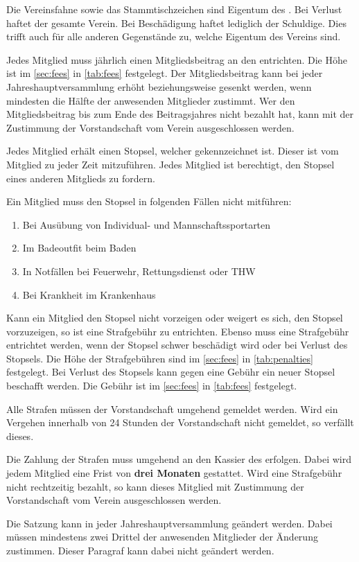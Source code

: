 Die Vereinsfahne sowie das Stammtischzeichen sind Eigentum des \emph{\vereinsName}.
Bei Verlust haftet der gesamte Verein.
Bei Beschädigung haftet lediglich der Schuldige.
Dies trifft auch für alle anderen Gegenstände zu, welche Eigentum des Vereins sind.

Jedes Mitglied muss jährlich einen Mitgliedsbeitrag an den \emph{\vereinsName} entrichten.
Die Höhe ist im \autoref{sec:fees} in \autoref{tab:fees} festgelegt.
Der Mitgliedsbeitrag kann bei jeder Jahreshauptversammlung erhöht beziehungsweise gesenkt werden,
wenn mindesten die Hälfte der anwesenden Mitglieder zustimmt.
Wer den Mitgliedsbeitrag bis zum Ende des Beitragsjahres nicht bezahlt hat,
kann mit der Zustimmung der Vorstandschaft vom Verein ausgeschlossen werden.

Jedes Mitglied erhält einen Stopsel, welcher gekennzeichnet ist.
Dieser ist vom Mitglied zu jeder Zeit mitzuführen.
Jedes Mitglied ist berechtigt, den Stopsel eines anderen Mitglieds zu fordern.

Ein Mitglied muss den Stopsel in folgenden Fällen nicht mitführen:
\begin{enumerate}
    \item Bei Ausübung von Individual- und Mannschaftssportarten
    \item Im Badeoutfit beim Baden
    \item In Notfällen bei Feuerwehr, Rettungsdienst oder THW
    \item Bei Krankheit im Krankenhaus
\end{enumerate}

Kann ein Mitglied den Stopsel nicht vorzeigen oder weigert es sich,
den Stopsel vorzuzeigen, so ist eine Strafgebühr zu entrichten.
Ebenso muss eine Strafgebühr entrichtet werden, wenn der Stopsel schwer beschädigt wird
oder bei Verlust des Stopsels.
Die Höhe der Strafgebühren sind im \autoref{sec:fees} in \autoref{tab:penalties} festgelegt.
Bei Verlust des Stopsels kann gegen eine Gebühr ein neuer Stopsel beschafft werden.
Die Gebühr ist im \autoref{sec:fees} in \autoref{tab:fees} festgelegt.

Alle Strafen müssen der Vorstandschaft umgehend gemeldet werden.
Wird ein Vergehen innerhalb von 24 Stunden der Vorstandschaft nicht gemeldet,
so verfällt dieses.

Die Zahlung der Strafen muss umgehend an den Kassier des \emph{\vereinsName} erfolgen.
Dabei wird jedem Mitglied eine Frist von \textbf{drei Monaten} gestattet.
Wird eine Strafgebühr nicht rechtzeitig bezahlt,
so kann dieses Mitglied mit Zustimmung der Vorstandschaft vom Verein ausgeschlossen werden.

Die Satzung kann in jeder Jahreshauptversammlung geändert werden.
Dabei müssen mindestens zwei Drittel der anwesenden Mitglieder der Änderung zustimmen.
Dieser Paragraf kann dabei nicht geändert werden.
